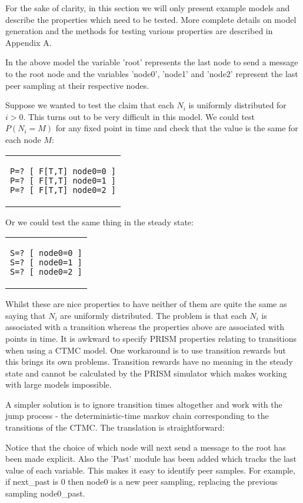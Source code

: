 \documentclass[a4paper,10pt]{article}
\newcommand{\prismmodel}[1]{
  \begin{quotation}
  \footnotesize
  
  \end{quotation}
}
\newenvironment{prismprop}[0]{
  \begin{center}
  \begin{tabular}{c}
  \footnotesize
}{
  \end{tabular}
  \end{center}
}
\begin{document}
\prismmodel{ctmc_single}

For the sake of clarity, in this section we will only present example models and describe the properties which need to be tested. More complete details on model generation and the methods for testing various properties are described in Appendix A.

In the above model the variable 'root' represents the last node to send a message to the root node and the variables 'node0', 'node1' and 'node2' represent the last peer sampling at their respective nodes.

Suppose we wanted to test the claim that each $N_i$ is uniformly distributed for $i>0$. This turns out to be very difficult in this model. We could test $P(N_i = M)$ for any fixed point in time and check that the value is the same for each node $M$:

\begin{prismprop}
\begin{lstlisting}
P=? [ F[T,T] node0=0 ]
P=? [ F[T,T] node0=1 ]
P=? [ F[T,T] node0=2 ]
\end{lstlisting}
\end{prismprop}

Or we could test the same thing in the steady state:

\begin{prismprop}
\begin{lstlisting}
S=? [ node0=0 ]
S=? [ node0=1 ]
S=? [ node0=2 ]
\end{lstlisting}
\end{prismprop}

Whilst these are nice properties to have neither of them are quite the same as saying that $N_i$ are uniformly distributed. The problem is that each $N_i$ is associated with a transition whereas the properties above are associated with points in time. It is awkward to specify PRISM properties relating to transitions when using a CTMC model. One workaround is to use transition rewards but this brings its own problems. Transition rewards have no meaning in the steady state and cannot be calculated by the PRISM simulator which makes working with large models impossible.

A simpler solution is to ignore transition times altogether and work with the jump process - the deterministic-time markov chain corresponding to the transitions of the CTMC. The translation is straightforward:

\prismmodel{dtmc_single}

Notice that the choice of which node will next send a message to the root has been made explicit. Also the 'Past' module has been added which tracks the last value of each variable. This makes it easy to identify peer samples. For example, if next\_past is 0 then node0 is a new peer sampling, replacing the previous sampling node0\_past.
\end{document}
